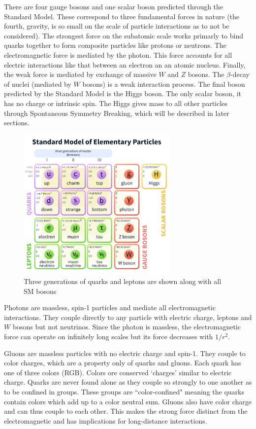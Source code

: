 There are four gauge bosons and one scalar boson predicted through the Standard Model. These correspond to three fundamental forces in nature (the fourth, gravity, is so small on the scale of particle interactions as to not be considered). The strongest force on the subatomic scale works primarly to bind quarks together to form composite particles like protons or neutrons. The electromagnetic force is mediated by the photon. This force accounts for all electric interactions like that between an electron an an atomic nucleus. Finally, the weak force is mediated by exchange of massive $W$ and $Z$ bosons. The $\beta$-decay of nuclei (mediated by $W$ bosons) is a weak interaction process. The final boson predicted by the Standard Model is the Higgs boson. The only scalar boson, it has no charge or intrinsic spin. The Higgs gives mass to all other particles through Spontaneous Symmetry Breaking, which will be described in later sections.
\begin{figure}[H]
	\centering
    \includegraphics[width=0.7\textwidth] {Pictures/SMparticles.png}\hspace{1cm}
    \caption{Three generations of quarks and leptons are shown along with all SM bosons \cite{PDG}}
    \label{fig:SMparticles}
\end{figure}
Photons are massless, spin-1 particles and mediate all electromagnetic interactions. They couple directly to any particle with electric charge, leptons and $W$ bosons but not neutrinos. Since the photon is massless, the electromagnetic force can operate on infinitely long scales but its force decreases with $1/r^2$.
 
Gluons are massless particles with no electric charge and spin-1. They couple to color charges, which are a property only of quarks and gluons. Each quark has one of three colors (RGB). Colors ore conserved `charges' similar to electric charge. Quarks are never found alone as they couple so strongly to one another as to be confined in groups. These groups are ``color-confined" meaning the quarks contain colors which add up to a color neutral sum.  Gluons also have color charge and can thus couple to each other. This makes the strong force distinct from the electromagnetic and has implications for long-distance interactions.
 
